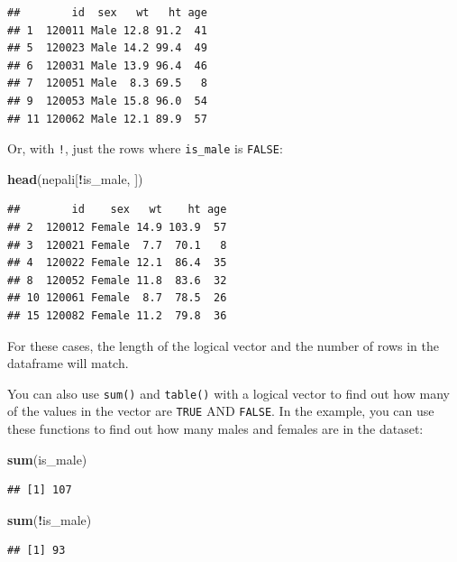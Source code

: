 \documentclass[]{book}
\makeatletter
\newenvironment{Shaded}{\begin{snugshade}}{\end{snugshade}}
\newcommand{\KeywordTok}[1]{\textcolor[rgb]{0.13,0.29,0.53}{\textbf{#1}}}
\newcommand{\OperatorTok}[1]{\textcolor[rgb]{0.81,0.36,0.00}{\textbf{#1}}}
\newcommand{\NormalTok}[1]{#1}
\newenvironment{kframe}{%
\medskip{}
\setlength{\fboxsep}{.8em}
 \def\at@end@of@kframe{}%
 \ifinner\ifhmode%
  \def\at@end@of@kframe{\end{minipage}}%
  \begin{minipage}{\columnwidth}%
 \fi\fi%
 \def\FrameCommand##1{\hskip\@totalleftmargin \hskip-\fboxsep
 \colorbox{shadecolor}{##1}\hskip-\fboxsep
     \hskip-\linewidth \hskip-\@totalleftmargin \hskip\columnwidth}%
 \MakeFramed {\advance\hsize-\width
   \@totalleftmargin\z@ \linewidth\hsize
   \@setminipage}}%
 {\par\unskip\endMakeFramed%
 \at@end@of@kframe}
\renewenvironment{Shaded}{\begin{kframe}}{\end{kframe}}
\theoremstyle{definition}
\theoremstyle{definition}
\theoremstyle{definition}
\theoremstyle{remark}
\makeatother
\begin{document}
\begin{verbatim}
##        id  sex   wt   ht age
## 1  120011 Male 12.8 91.2  41
## 5  120023 Male 14.2 99.4  49
## 6  120031 Male 13.9 96.4  46
## 7  120051 Male  8.3 69.5   8
## 9  120053 Male 15.8 96.0  54
## 11 120062 Male 12.1 89.9  57
\end{verbatim}

Or, with \texttt{!}, just the rows where \texttt{is\_male} is
\texttt{FALSE}:

\begin{Shaded}
\begin{Highlighting}[]
\KeywordTok{head}\NormalTok{(nepali[}\OperatorTok{!}\NormalTok{is_male, ])}
\end{Highlighting}
\end{Shaded}

\begin{verbatim}
##        id    sex   wt    ht age
## 2  120012 Female 14.9 103.9  57
## 3  120021 Female  7.7  70.1   8
## 4  120022 Female 12.1  86.4  35
## 8  120052 Female 11.8  83.6  32
## 10 120061 Female  8.7  78.5  26
## 15 120082 Female 11.2  79.8  36
\end{verbatim}

For these cases, the length of the logical vector and the number of rows
in the dataframe will match.

You can also use \texttt{sum()} and \texttt{table()} with a logical
vector to find out how many of the values in the vector are
\texttt{TRUE} AND \texttt{FALSE}. In the example, you can use these
functions to find out how many males and females are in the dataset:

\begin{Shaded}
\begin{Highlighting}[]
\KeywordTok{sum}\NormalTok{(is_male)}
\end{Highlighting}
\end{Shaded}

\begin{verbatim}
## [1] 107
\end{verbatim}

\begin{Shaded}
\begin{Highlighting}[]
\KeywordTok{sum}\NormalTok{(}\OperatorTok{!}\NormalTok{is_male)}
\end{Highlighting}
\end{Shaded}

\begin{verbatim}
## [1] 93
\end{verbatim}
\end{document}
